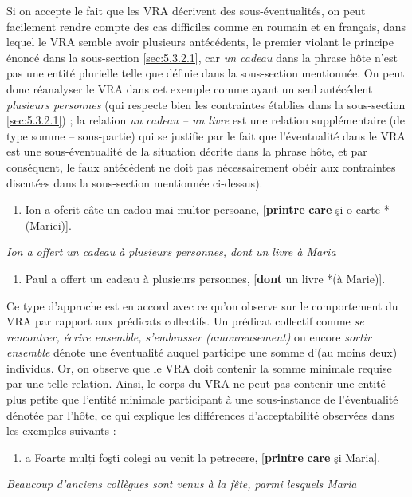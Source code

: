 Si on accepte le fait que les VRA décrivent des sous-éventualités, on peut facilement rendre compte des cas difficiles comme  en roumain et  en français, dans lequel le VRA semble avoir plusieurs antécédents, le premier violant le principe énoncé dans la sous-section \ref{sec:5.3.2.1}, car \textit{un cadeau} dans la phrase hôte n'est pas une entité plurielle telle que définie dans la sous-section mentionnée. On peut donc réanalyser le VRA dans cet exemple comme ayant un seul antécédent \textit{plusieurs personnes} (qui respecte bien les contraintes établies dans la sous-section \ref{sec:5.3.2.1}) ; la relation \textit{un cadeau -- un livre} est une relation supplémentaire (de type somme -- sous-partie) qui se justifie par le fait que l'éventualité dans le VRA est une sous-éventualité de la situation décrite dans la phrase hôte, et par conséquent, le faux antécédent ne doit pas nécessairement obéir aux contraintes discutées dans la sous-section mentionnée ci-dessus). 


\begin{enumerate}
\item \label{bkm:Ref295411593}Ion a oferit câte un cadou mai multor persoane, [\textbf{printre} \textbf{care} şi o carte *(Mariei)]. 


\end{enumerate}
{\itshape
Ion a offert un cadeau à plusieurs personnes, dont un livre à Maria} 


\begin{enumerate}
\item \label{bkm:Ref295411595}Paul a offert un cadeau à plusieurs personnes, [\textbf{dont} un livre *(à Marie)]. 


\end{enumerate}
Ce type d'approche est en accord avec ce qu'on observe sur le comportement du VRA par rapport aux prédicats collectifs. Un prédicat collectif comme \textit{se rencontrer, écrire ensemble, s'embrasser (amoureusement)} ou encore \textit{sortir ensemble} dénote une éventualité auquel participe une somme d'(au moins deux) individus. Or, on observe que le VRA doit contenir la somme minimale requise par une telle relation. Ainsi, le corps du VRA ne peut pas contenir une entité plus petite que l'entité minimale participant à une sous-instance de l'éventualité dénotée par l'hôte, ce qui explique les différences d'acceptabilité observées dans les exemples suivants :


\begin{enumerate}
\item a  Foarte mulți foşti colegi au venit la petrecere, [\textbf{printre} \textbf{care} şi Maria].  


\end{enumerate}
{\itshape
Beaucoup d'anciens collègues sont venus à la fête, parmi lesquels Maria}

